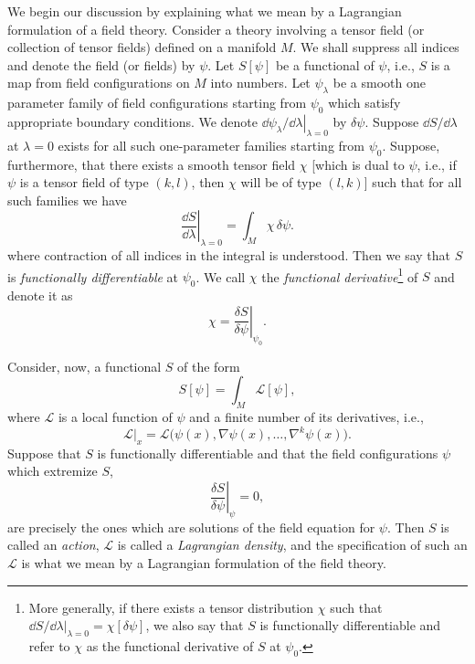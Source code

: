 We begin our discussion by explaining what we mean by a Lagrangian formulation
of a field theory. Consider a theory involving a tensor field (or collection of tensor
fields) defined on a manifold \(M\). We shall suppress all indices and denote the
field (or fields) by \(\psi\). Let \(S[\psi]\) be a functional of \(\psi\), i.e., \(S\)
is a map from field configurations on \(M\) into numbers. Let \(\psi_\lambda\) be a
smooth one parameter family of field configurations starting from \(\psi_0\) which
satisfy appropriate boundary conditions. We denote
\(\left.\dd\psi_\lambda/\dd\lambda\right|_{\lambda=0}\) by \(\delta\psi\). Suppose
\(\dd S/\dd\lambda\) at \(\lambda=0\) exists for all such one-parameter families
starting from \(\psi_0\). Suppose, furthermore, that there exists a smooth tensor
field \(\chi\) [which is dual to \(\psi\), i.e., if \(\psi\) is a tensor field of type
\((k,l)\), then \(\chi\) will be of type \((l,k)\)] such that for all such families
we have
\begin{equation}
  \left.\frac{\dd S}{\dd\lambda}\right|_{\lambda=0}
    =\int_M \chi\,\delta\psi .
  \tag{E.1.1}\label{eq:E.1.1}
\end{equation}
where contraction of all indices in the integral is understood. Then we say that
\(S\) is \emph{functionally differentiable} at \(\psi_0\). We call \(\chi\) the
\emph{functional derivative}\footnote{More generally, if there exists a tensor
distribution \(\chi\) such that
\(\left.\dd S/\dd\lambda\right|_{\lambda=0}=\chi[\delta\psi]\), we also say that \(S\)
is functionally differentiable and refer to \(\chi\) as the functional derivative of
\(S\) at \(\psi_0\).} of \(S\) and denote it as
\begin{equation}
  \chi=\left.\frac{\delta S}{\delta\psi}\right|_{\psi_0}.
  \tag{E.1.2}\label{eq:E.1.2}
\end{equation}

Consider, now, a functional \(S\) of the form
\begin{equation}
  S[\psi]=\int_M\mathcal L[\psi],
  \tag{E.1.3}\label{eq:E.1.3}
\end{equation}
where \(\mathcal L\) is a local function of \(\psi\) and a finite number of its
derivatives, i.e.,
\begin{equation}
  \left.\mathcal L\right|_x
    =\mathcal L\bigl(\psi(x),\nabla\psi(x),\ldots,\nabla^k\psi(x)\bigr).
  \tag{E.1.4}\label{eq:E.1.4}
\end{equation}
Suppose that \(S\) is functionally differentiable and that the field configurations
\(\psi\) which extremize \(S\),
\begin{equation}
  \left.\frac{\delta S}{\delta\psi}\right|_\psi=0,
  \tag{E.1.5}\label{eq:E.1.5}
\end{equation}
are precisely the ones which are solutions of the field equation for \(\psi\). Then
\(S\) is called an \emph{action}, \(\mathcal L\) is called a \emph{Lagrangian
density}, and the specification of such an \(\mathcal L\) is what we mean by a
Lagrangian formulation of the field theory.

